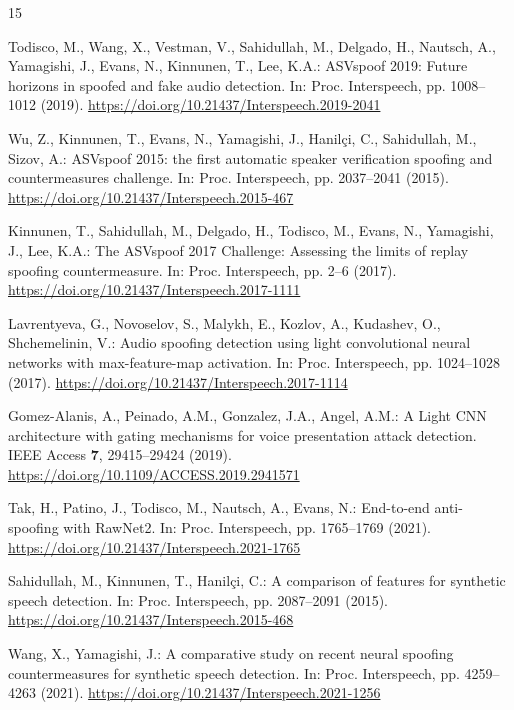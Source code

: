 \documentclass[runningheads]{llncs}
\begin{document}
\begin{thebibliography}{15}

Todisco, M., Wang, X., Vestman, V., Sahidullah, M., Delgado, H., Nautsch, A., Yamagishi, J., Evans, N., Kinnunen, T., Lee, K.A.: ASVspoof 2019: Future horizons in spoofed and fake audio detection. In: Proc. Interspeech, pp. 1008--1012 (2019). \url{https://doi.org/10.21437/Interspeech.2019-2041}

Wu, Z., Kinnunen, T., Evans, N., Yamagishi, J., Hanil{\c{c}}i, C., Sahidullah, M., Sizov, A.: ASVspoof 2015: the first automatic speaker verification spoofing and countermeasures challenge. In: Proc. Interspeech, pp. 2037--2041 (2015). \url{https://doi.org/10.21437/Interspeech.2015-467}

Kinnunen, T., Sahidullah, M., Delgado, H., Todisco, M., Evans, N., Yamagishi, J., Lee, K.A.: The ASVspoof 2017 Challenge: Assessing the limits of replay spoofing countermeasure. In: Proc. Interspeech, pp. 2--6 (2017). \url{https://doi.org/10.21437/Interspeech.2017-1111}

Lavrentyeva, G., Novoselov, S., Malykh, E., Kozlov, A., Kudashev, O., Shchemelinin, V.: Audio spoofing detection using light convolutional neural networks with max-feature-map activation. In: Proc. Interspeech, pp. 1024--1028 (2017). \url{https://doi.org/10.21437/Interspeech.2017-1114}

Gomez-Alanis, A., Peinado, A.M., Gonzalez, J.A., Angel, A.M.: A Light CNN architecture with gating mechanisms for voice presentation attack detection. IEEE Access \textbf{7}, 29415--29424 (2019). \url{https://doi.org/10.1109/ACCESS.2019.2941571}

Tak, H., Patino, J., Todisco, M., Nautsch, A., Evans, N.: End-to-end anti-spoofing with RawNet2. In: Proc. Interspeech, pp. 1765--1769 (2021). \url{https://doi.org/10.21437/Interspeech.2021-1765}

Sahidullah, M., Kinnunen, T., Hanil{\c{c}}i, C.: A comparison of features for synthetic speech detection. In: Proc. Interspeech, pp. 2087--2091 (2015). \url{https://doi.org/10.21437/Interspeech.2015-468}

Wang, X., Yamagishi, J.: A comparative study on recent neural spoofing countermeasures for synthetic speech detection. In: Proc. Interspeech, pp. 4259--4263 (2021). \url{https://doi.org/10.21437/Interspeech.2021-1256}


\end{thebibliography}
\end{document}
